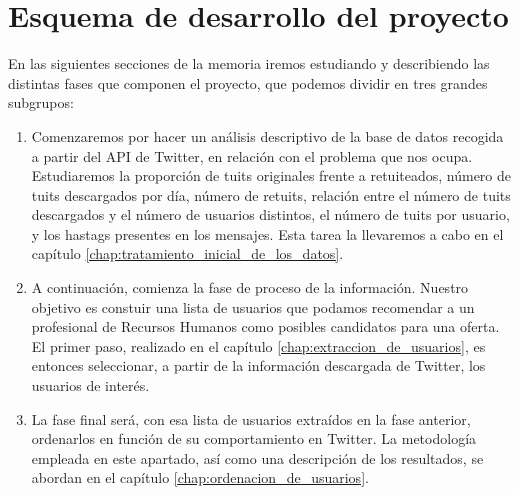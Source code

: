 \section{Esquema de desarrollo del proyecto}
En las siguientes secciones de la memoria iremos estudiando y describiendo las distintas
fases que componen el proyecto, que podemos dividir en tres grandes subgrupos:
\begin{enumerate}
\item Comenzaremos por hacer un análisis descriptivo de la base de datos recogida a partir del API de Twitter, en relación con el problema que nos ocupa. Estudiaremos la proporción de tuits originales
frente a retuiteados, número de tuits descargados por día, número de retuits, relación entre el 
número de tuits descargados y el número de usuarios distintos, el número de tuits por usuario, y
los hastags presentes en los mensajes. Esta tarea la llevaremos a cabo en el capítulo \ref{chap:tratamiento_inicial_de_los_datos}.

\item A continuación, comienza la fase de proceso de la información. Nuestro objetivo es 
constuir una lista de usuarios que podamos recomendar a un profesional de Recursos Humanos como
posibles candidatos para una oferta. El primer paso, realizado en el capítulo \ref{chap:extraccion_de_usuarios}, es entonces seleccionar, a partir de la información descargada de Twitter, los usuarios de interés. 

\item La fase final será, con esa lista de usuarios extraídos en la fase anterior, ordenarlos
en función de su comportamiento en Twitter. La metodología empleada en este apartado, así como una descripción de los resultados, se abordan en el capítulo \ref{chap:ordenacion_de_usuarios}.
\end{enumerate}